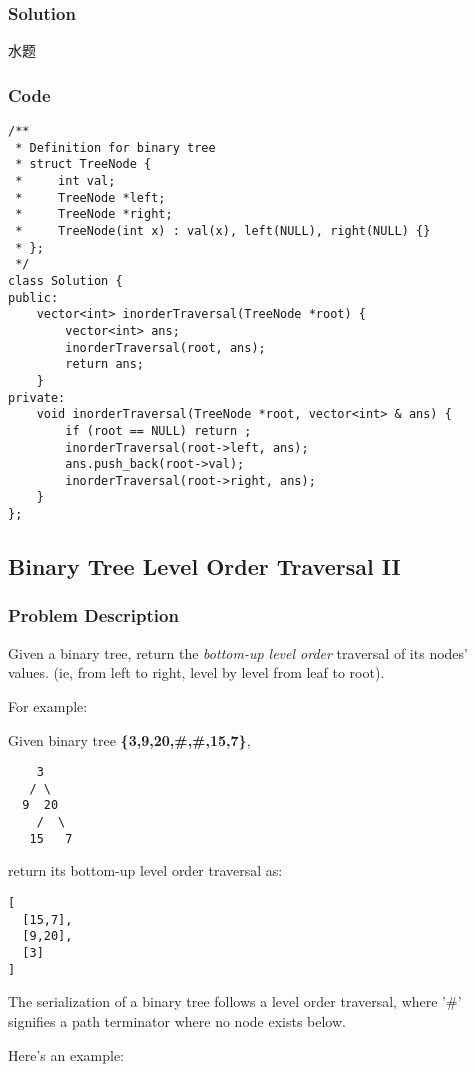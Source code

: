 \documentclass[courier]{article}
\begin{document}
\begin{CJK*}{UTF8}{gkai}
\subsubsection*{Solution}
水题

\subsubsection*{Code}
\begin{lstlisting}
/**
 * Definition for binary tree
 * struct TreeNode {
 *     int val;
 *     TreeNode *left;
 *     TreeNode *right;
 *     TreeNode(int x) : val(x), left(NULL), right(NULL) {}
 * };
 */
class Solution {
public:
    vector<int> inorderTraversal(TreeNode *root) {
        vector<int> ans;
        inorderTraversal(root, ans);
        return ans;
    }
private:
    void inorderTraversal(TreeNode *root, vector<int> & ans) {
        if (root == NULL) return ;
        inorderTraversal(root->left, ans);
        ans.push_back(root->val);
        inorderTraversal(root->right, ans);
    }
}; 
\end{lstlisting}


\subsection{ Binary Tree Level Order Traversal II }

\subsubsection*{Problem Description}
Given a binary tree, return the \emph{bottom-up level order} traversal of its nodes' values. (ie, from left to right, level by level from leaf to root).

For example:


Given binary tree \textbf{\{3,9,20,\#,\#,15,7\}},


\begin{verbatim}
    3
   / \
  9  20
    /  \
   15   7
\end{verbatim}

return its bottom-up level order traversal as:


\begin{verbatim}
[
  [15,7],
  [9,20],
  [3]
]
\end{verbatim}

The serialization of a binary tree follows a level order traversal, where '\#' signifies a path terminator where no node exists below.

Here's an example:



\end{CJK*}
\end{document}
